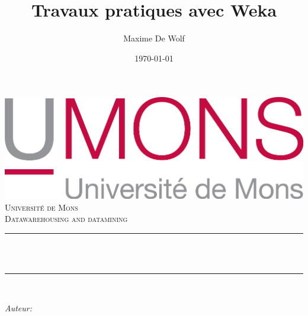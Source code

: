 \documentclass[11pt,a4paper]{article}
\title{Travaux pratiques avec Weka}                             %
\author{Maxime De Wolf}                               %
\date{\today}                                           %
\makeatletter
\let\thetitle\@title
\let\theauthor\@author
\let\thedate\@date
\makeatother
\begin{document}
   	
   	
   	\begin{titlepage}
   		\centering
   		\vspace*{0.5 cm}
   		\includegraphics[scale = 0.75]{UMONS}\\[1.0 cm]   %
   		\textsc{\LARGE Université de Mons}\\[2.0 cm]   %
   		\textsc{\large Datawarehousing and datamining}\\[0.5 cm]               %
   		\rule{\linewidth}{0.2 mm} \\[0.4 cm]
   		{ \huge \bfseries \thetitle}\\
   		\rule{\linewidth}{0.2 mm} \\[1.5 cm]
   		
   		\begin{minipage}{0.4\textwidth}
   			\begin{flushleft} \large
   				\emph{Auteur:}\\
   				\theauthor
   			\end{flushleft}
   		\end{minipage}~
   		\begin{minipage}{0.4\textwidth}
   			\begin{flushright} \large
   			\end{flushright}
   		\end{minipage}\\[2 cm]
   		
   		{\large \thedate}\\[2 cm]
   		
   		\vfill
   		
   	\end{titlepage}
   	
   	
   	\tableofcontents
   	\newpage
   	
\end{document}
